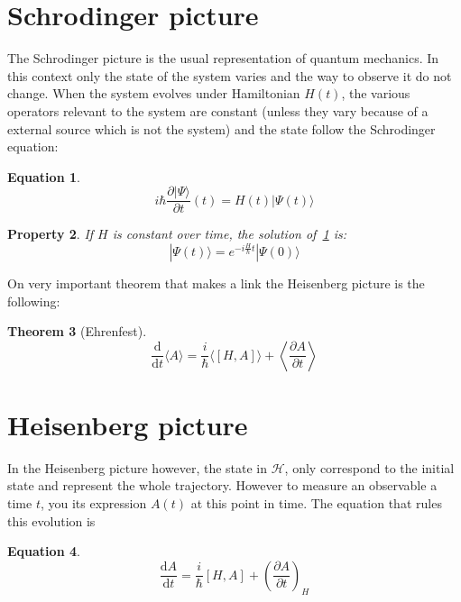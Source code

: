 \documentclass[10pt,a4paper]{report}
\theoremstyle{plain}
\newtheorem{thm}{Theorem}[chapter]
\newtheorem{prop}[thm]{Property}
\theoremstyle{definition}
\newtheorem{eqn}[thm]{Equation}
\theoremstyle{remark}
\newcommand{\TODO}{\textbf{TODO}}
\newcommand{\ket}[1]{|#1\rangle}
\newcommand{\dd}{\mathrm{d}}
\newcommand{\der}[2]{\frac{\dd{#1}}{\dd{#2}}}
\newcommand{\dpar}[2]{\frac{\partial{#1}}{\partial{#2}}}
\begin{document}

\section{Schrodinger picture}

The Schrodinger picture is the usual representation of quantum mechanics. In
this context only the state of the system varies and the way to observe it do
not change. When the system evolves under Hamiltonian $H(t)$,
the various operators relevant to the system are constant (unless they vary
because of a external source which is not the system) and the
state follow the Schrodinger equation:
\begin{eqn}\label{eqn:schro}
\[i\hbar \frac{\partial \ket \Psi}{\partial t} (t) = H(t) \ket {\Psi(t)} \]
\end{eqn}

\begin{prop}
  If $H$ is constant over time, the solution of~\cref{eqn:schro} is:
  \[ \ket {\Psi(t)} = e^{-i\frac H\hbar t}\ket{\Psi(0)}\]
\end{prop}

On very important theorem that makes a link the Heisenberg picture is the
following:

\begin{thm}[Ehrenfest]\label{thm:ehren}
  \[\der{}t\langle A\rangle = \frac i\hbar\langle[H,A]\rangle + \left\langle\dpar
      A t \right\rangle\]
\end{thm}



\section{Heisenberg picture}

In the Heisenberg picture however, the state in $\mathcal{H}$, only correspond
to the initial state and represent the whole trajectory. However to measure an
observable a time $t$, you its expression $A(t)$ at this point in time. The
equation that rules this evolution is



\begin{eqn}
  \[\der At   = \frac i {\hbar}[H,A] + {\left(\dpar At \right)}_{\!\!H}\]
\end{eqn}
\end{document}
